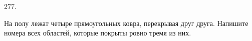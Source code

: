 277. \begin{center}
\begin{figure}[ht!]
\end{figure}
\end{center}
На полу лежат четыре прямоугольных ковра, перекрывая друг друга. Напишите номера всех областей, которые покрыты ровно тремя из них.\newpage\noindent
